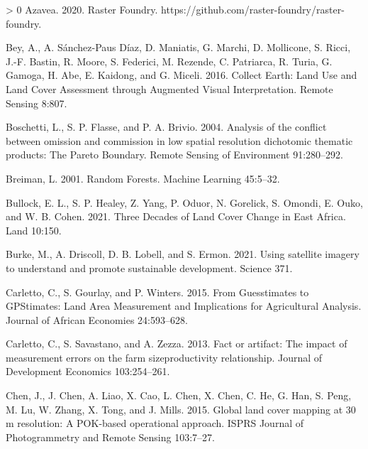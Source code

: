 \documentclass[11pt,a4paper]{article}
\newlength{\cslhangindent}
\newenvironment{CSLReferences}[3] %
 {%
  \setlength{\parindent}{0pt}
  \ifodd #1 \everypar{\setlength{\hangindent}{\cslhangindent}}\ignorespaces\fi
  \ifnum #2 > 0
  \setlength{\parskip}{#2\baselineskip}
  \fi
 }%
 {}
\begin{document}
\hypertarget{refs}{}
\begin{CSLReferences}{1}{0}
\leavevmode\hypertarget{ref-azaveaRasterFoundry2020}{}%
Azavea. 2020. Raster {Foundry}.
https://github.com/raster-foundry/raster-foundry.

\leavevmode\hypertarget{ref-BeyCollectEarthLand2016}{}%
Bey, A., A. Sánchez-Paus Díaz, D. Maniatis, G. Marchi, D. Mollicone, S.
Ricci, J.-F. Bastin, R. Moore, S. Federici, M. Rezende, C. Patriarca, R.
Turia, G. Gamoga, H. Abe, E. Kaidong, and G. Miceli. 2016. Collect
{Earth}: {Land Use} and {Land Cover Assessment} through {Augmented
Visual Interpretation}. Remote Sensing 8:807.

\leavevmode\hypertarget{ref-boschettiAnalysisConflictOmission2004}{}%
Boschetti, L., S. P. Flasse, and P. A. Brivio. 2004. Analysis of the
conflict between omission and commission in low spatial resolution
dichotomic thematic products: {The Pareto Boundary}. Remote Sensing of
Environment 91:280--292.

\leavevmode\hypertarget{ref-BreimanRandomForests2001}{}%
Breiman, L. 2001. Random {Forests}. Machine Learning 45:5--32.

\leavevmode\hypertarget{ref-bullockThreeDecadesLand2021}{}%
Bullock, E. L., S. P. Healey, Z. Yang, P. Oduor, N. Gorelick, S. Omondi,
E. Ouko, and W. B. Cohen. 2021. Three {Decades} of {Land Cover Change}
in {East Africa}. Land 10:150.

\leavevmode\hypertarget{ref-burkeUsingSatelliteImagery2021}{}%
Burke, M., A. Driscoll, D. B. Lobell, and S. Ermon. 2021. Using
satellite imagery to understand and promote sustainable development.
Science 371.

\leavevmode\hypertarget{ref-CarlettoGuesstimatesGPStimatesLand2015}{}%
Carletto, C., S. Gourlay, and P. Winters. 2015. From {Guesstimates} to
{GPStimates}: {Land Area Measurement} and {Implications} for
{Agricultural Analysis}. Journal of African Economies 24:593--628.

\leavevmode\hypertarget{ref-CarlettoFactartifactimpact2013}{}%
Carletto, C., S. Savastano, and A. Zezza. 2013. Fact or artifact: {The}
impact of measurement errors on the farm size{}productivity
relationship. Journal of Development Economics 103:254--261.

\leavevmode\hypertarget{ref-ChenGloballandcover2015}{}%
Chen, J., J. Chen, A. Liao, X. Cao, L. Chen, X. Chen, C. He, G. Han, S.
Peng, M. Lu, W. Zhang, X. Tong, and J. Mills. 2015. Global land cover
mapping at 30 m resolution: {A POK}-based operational approach. ISPRS
Journal of Photogrammetry and Remote Sensing 103:7--27.


\end{CSLReferences}
\end{document}
